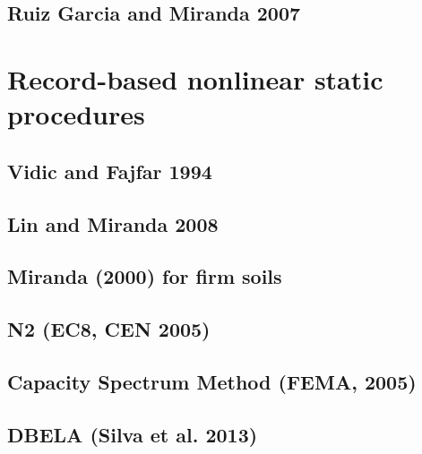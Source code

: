 		\subsection{Ruiz Garcia and Miranda 2007}
		\label{subsec:RuizGarciaMiranda}
		

	\section{Record-based nonlinear static procedures}
	\label{sec:record-nsp}
	

		\subsection{Vidic and Fajfar 1994}
		\label{subsec:VidicEtAl1994}
		

		\subsection{Lin and Miranda 2008}
		\label{subsec:LinMiranda2008}
		

		\subsection{Miranda (2000) for firm soils}
		\label{subsec:Miranda}
		

		\subsection{N2 (EC8, CEN 2005)}
		\label{subsec:N2}
		

		\subsection{Capacity Spectrum Method (FEMA, 2005)}
		\label{subsec:CSM}
		

		\subsection{DBELA (Silva et al. 2013)}
		\label{subsec:DBELA_Silva2013}
		

